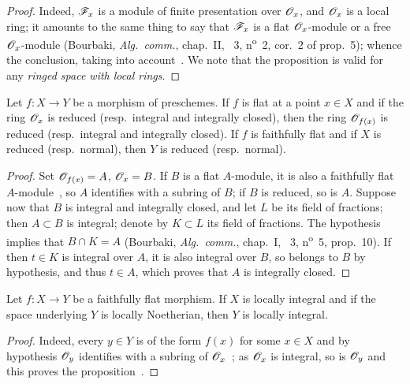 \begin{proof}
Indeed, $\mathscr{F}_x$ is a module of finite presentation over $\mathscr{O}_x$, and $\mathscr{O}_x$ is a local ring; it amounts to the same thing to say that $\mathscr{F}_x$ is a flat $\mathscr{O}_x$-module or a free $\mathscr{O}_x$-module (Bourbaki, \emph{Alg.~comm.}, chap.~II, \textsection~3, n\textsuperscript{o}~2, cor.~2 of prop.~5); whence the conclusion, taking into account~.
We note that the proposition is valid for any \emph{ringed space with local rings}.
\end{proof}

\begin{proposition}[2.1.13]
\label{IV.2.1.13}
Let $f:X\to Y$ be a morphism of preschemes. If $f$ is flat at a point $x\in X$ and if the ring $\mathscr{O}_x$ is reduced \textnormal{(}\textup{resp.}\ integral and integrally closed\textnormal{)}, then the ring $\mathscr{O}_{f(x)}$
is reduced \textnormal{(}\textup{resp.}\ integral and integrally closed\textnormal{)}.
If $f$ is faithfully flat and if $X$ is reduced \textnormal{(}\textup{resp.}\ normal\textnormal{)}, then $Y$ is reduced \textnormal{(}\textup{resp.}\ normal\textnormal{)}.
\end{proposition}

\begin{proof}
Set $\mathscr{O}_{f(x)}=A$, $\mathscr{O}_x=B$.
If $B$ is a flat $A$-module, it is also a faithfully flat $A$-module~, so $A$ identifies with a subring of $B$; if $B$ is reduced, so is $A$.
Suppose now that $B$ is integral and integrally closed, and let $L$ be its field of fractions; then $A\subset B$ is integral; denote by $K\subset L$ its field of fractions.
The hypothesis implies that $B\cap K=A$ (Bourbaki, \emph{Alg.~comm.}, chap.~I, \textsection~3, n\textsuperscript{o}~5, prop.~10).
If then $t\in K$ is integral over $A$, it is also integral over $B$, so belongs to $B$ by hypothesis, and thus $t\in A$, which proves that $A$ is integrally closed.
\end{proof}

\begin{proposition}[2.1.14]
\label{IV.2.1.14}
Let $f:X\to Y$ be a faithfully flat morphism. If $X$ is locally integral and if the space underlying $Y$ is locally Noetherian, then $Y$ is locally integral.
\end{proposition}

\begin{proof}
Indeed, every $y\in Y$ is of the form $f(x)$ for some $x\in X$ and by hypothesis $\mathscr{O}_y$ identifies with a subring of $\mathscr{O}_x$~; as $\mathscr{O}_x$ is integral, so is $\mathscr{O}_y$ and this proves the proposition~.
\end{proof}

